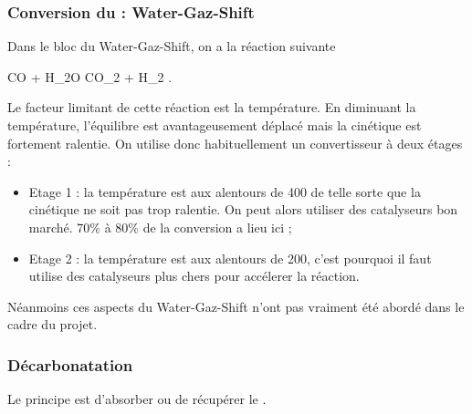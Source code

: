 \subsubsection{Conversion du  : Water-Gaz-Shift}
Dans le bloc du Water-Gaz-Shift, on a la réaction
suivante
\begin{chemmath}
	CO + H_2O \Leftrightarrow CO_2 + H_2 . 
\end{chemmath}
Le facteur limitant de cette réaction est la température.
En diminuant la température, l'équilibre est avantageusement
déplacé mais la cinétique est fortement ralentie. On
utilise donc habituellement un convertisseur à deux étages :
\begin{itemize}
	\item	Etage 1 : la température est aux alentours de
	\unit{400}{\degreecelsius} de telle sorte que la cinétique
	ne soit pas trop ralentie. On peut alors utiliser
	des catalyseurs bon marché. 70\% à 80\% de la conversion a lieu
	ici ;
	\item Etage 2 : la température est aux alentours de
	\unit{200}{\degreecelsius}, c'est pourquoi il faut utilise
	des catalyseurs plus chers pour accélerer la réaction.
\end{itemize}

Néanmoins ces aspects du Water-Gaz-Shift n'ont pas
vraiment été abordé dans le cadre du projet.

\subsubsection{Décarbonatation}
Le principe est d'absorber ou de récupérer le .

